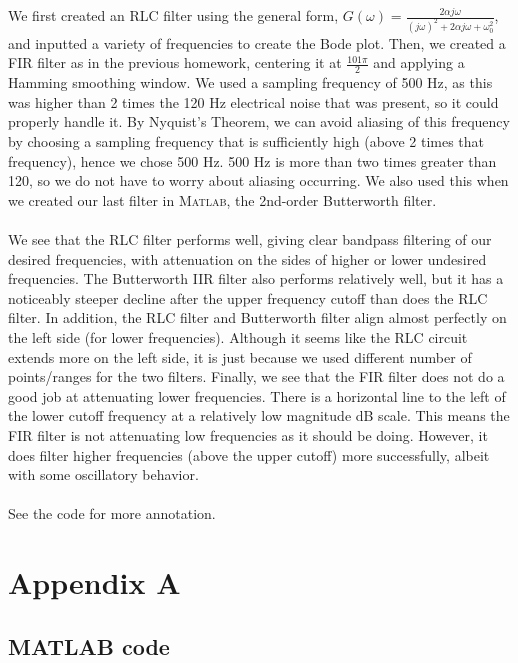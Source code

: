\documentclass[12pt, a4paper]{article}
\begin{document}
We first created an RLC filter using the general form, $G(\omega)=\frac{2 \alpha j \omega}{(j \omega)^{2}+2 \alpha j \omega+\omega_{0}^{2}}$, and inputted a variety of frequencies to create the Bode plot. Then, we created a FIR filter as in the previous homework, centering it at $\frac{101 \pi}{2}$ and applying a Hamming smoothing window. We used a sampling frequency of 500 Hz, as this was higher than 2 times the 120 Hz electrical noise that was present, so it could properly handle it. By Nyquist's Theorem, we can avoid aliasing of this frequency by choosing a sampling frequency that is sufficiently high (above 2 times that frequency), hence we chose 500 Hz. 500 Hz is more than two times greater than 120, so we do not have to worry about aliasing occurring. We also used this when we created our last filter in \textsc{Matlab}, the 2nd-order Butterworth filter. \\ \\
\noindent We see that the RLC filter performs well, giving clear bandpass filtering of our desired frequencies, with attenuation on the sides of higher or lower undesired frequencies. The Butterworth IIR filter also performs relatively well, but it has a noticeably steeper decline after the upper frequency cutoff than does the RLC filter. In addition, the RLC filter and Butterworth filter align almost perfectly on the left side (for lower frequencies). Although it seems like the RLC circuit extends more on the left side, it is just because we used different number of points/ranges for the two filters. Finally, we see that the FIR filter does not do a good job at attenuating lower frequencies. There is a horizontal line to the left of the lower cutoff frequency at a relatively low magnitude dB scale. This means the FIR filter is not attenuating low frequencies as it should be doing. However, it does filter higher frequencies (above the upper cutoff) more successfully, albeit with some oscillatory behavior.\\ \\
See the code for more annotation.
\pagebreak
\section*{\fontsize{19}{15}\selectfont Appendix A}
\subsection*{MATLAB code}
 
\end{document}
